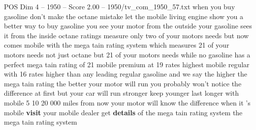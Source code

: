 \begin{textsample}{POS Dim 4 – 1950 – Score 2.00 – 1950/tv\_com\_1950\_57.txt}  \label{ex:f4_pos_090}
when you buy gasoline don't make the octane mistake let the mobile living engine show you a better way to buy gasoline you see your motor from the outside your gasoline sees it from the inside octane ratings measure only two of your motors needs but now comes mobile with the mega tain rating system which measures 21 of your motors needs not just octane but 21 of your motors needs while no gasoline has a perfect mega tain rating of 21 mobile premium at 19 rates highest mobile regular with 16 rates higher than any leading regular gasoline and we say the higher the mega tain rating the better your motor will run you probably won't notice the difference at first but your car will run stronger keep younger last longer with mobile 5 10 20 000 miles from now your motor will know the difference when it 's mobile \textbf{visit} your mobile dealer get \textbf{details} of the mega tain rating system the mega tain rating system

\end{textsample}
